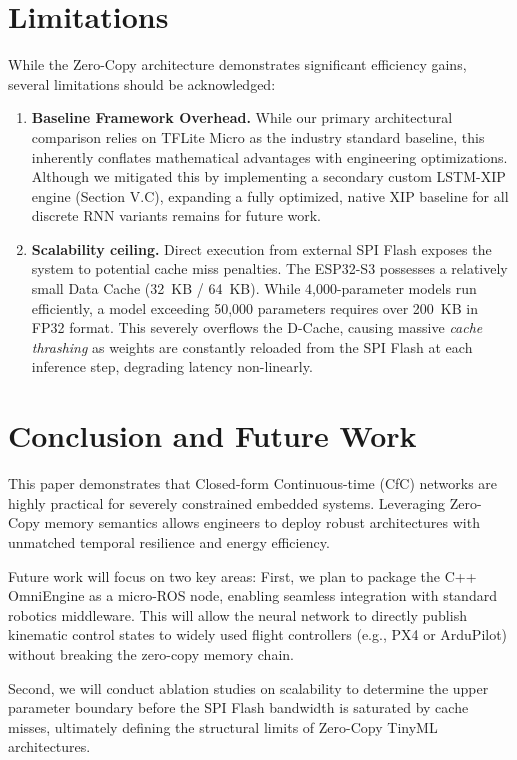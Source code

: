 \documentclass[conference]{IEEEtran}
\begin{document}
\section{Limitations}
While the Zero-Copy architecture demonstrates significant efficiency gains, several limitations should be acknowledged:
\begin{enumerate}
    \item \textbf{Baseline Framework Overhead.} While our primary architectural comparison relies on TFLite Micro as the industry standard baseline, this inherently conflates mathematical advantages with engineering optimizations. Although we mitigated this by implementing a secondary custom LSTM-XIP engine (Section V.C), expanding a fully optimized, native XIP baseline for all discrete RNN variants remains for future work.
    \item \textbf{Scalability ceiling.} Direct execution from external SPI Flash exposes the system to potential cache miss penalties. The ESP32-S3 possesses a relatively small Data Cache (32~KB / 64~KB). While 4,000-parameter models run efficiently, a model exceeding 50,000 parameters requires over 200~KB in FP32 format. This severely overflows the D-Cache, causing massive \textit{cache thrashing} as weights are constantly reloaded from the SPI Flash at each inference step, degrading latency non-linearly.
\end{enumerate}

\section{Conclusion and Future Work}
This paper demonstrates that Closed-form Continuous-time (CfC) networks are highly practical for severely constrained embedded systems. Leveraging Zero-Copy memory semantics allows engineers to deploy robust architectures with unmatched temporal resilience and energy efficiency. 

Future work will focus on two key areas: First, we plan to package the C++ OmniEngine as a micro-ROS node, enabling seamless integration with standard robotics middleware. This will allow the neural network to directly publish kinematic control states to widely used flight controllers (e.g., PX4 or ArduPilot) without breaking the zero-copy memory chain. 

Second, we will conduct ablation studies on scalability to determine the upper parameter boundary before the SPI Flash bandwidth is saturated by cache misses, ultimately defining the structural limits of Zero-Copy TinyML architectures.
\end{document}
